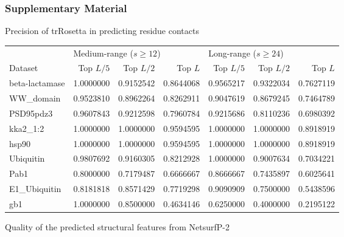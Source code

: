 \documentclass[10pt, british, luatex]{beamer}
\begin{document}
\begin{frame}
	\frametitle{Supplementary Material}
	Precision of trRosetta {\footnotesize\parencite{Yang2020}} in predicting residue contacts

	\tiny%
	\begin{tabular*}{\linewidth}{@{\extracolsep{\fill}}lrrrrrr}%
		\toprule
		& \multicolumn{3}{l}{Medium-range ($s \geq 12$)} & \multicolumn{3}{l}{Long-range ($s \geq 24$)} \\
		\cmidrule(l){2-7}
		Dataset & Top $L/5$ & Top $L/2$ & Top $L$ & Top $L/5$ & Top $L/2$ & Top $L$ \\
		\midrule
		beta-lactamase & \num{1.0000000} & \num{0.9152542} & \num{0.8644068} & \num{0.9565217} & \num{0.9322034} & \num{0.7627119} \\
		WW\_domain     & \num{0.9523810} & \num{0.8962264} & \num{0.8262911} & \num{0.9047619} & \num{0.8679245} & \num{0.7464789} \\
		PSD95pdz3      & \num{0.9607843} & \num{0.9212598} & \num{0.7960784} & \num{0.9215686} & \num{0.8110236} & \num{0.6980392} \\
		kka2\_1:2      & \num{1.0000000} & \num{1.0000000} & \num{0.9594595} & \num{1.0000000} & \num{1.0000000} & \num{0.8918919} \\
		hsp90          & \num{1.0000000} & \num{1.0000000} & \num{0.9594595} & \num{1.0000000} & \num{1.0000000} & \num{0.8918919} \\
		Ubiquitin      & \num{0.9807692} & \num{0.9160305} & \num{0.8212928} & \num{1.0000000} & \num{0.9007634} & \num{0.7034221} \\
		Pab1           & \num{0.8000000} & \num{0.7179487} & \num{0.6666667} & \num{0.8666667} & \num{0.7435897} & \num{0.6025641} \\
		E1\_Ubiquitin  & \num{0.8181818} & \num{0.8571429} & \num{0.7719298} & \num{0.9090909} & \num{0.7500000} & \num{0.5438596} \\
		gb1            & \num{1.0000000} & \num{0.8500000} & \num{0.4634146} & \num{0.6250000} & \num{0.4000000} & \num{0.2195122} \\
		\bottomrule
	\end{tabular*}%
	\vfill%

	\normalsize Quality of the predicted structural features from NetsurfP-2 {\footnotesize\parencite{Klausen2019}}


\end{frame}
\end{document}
